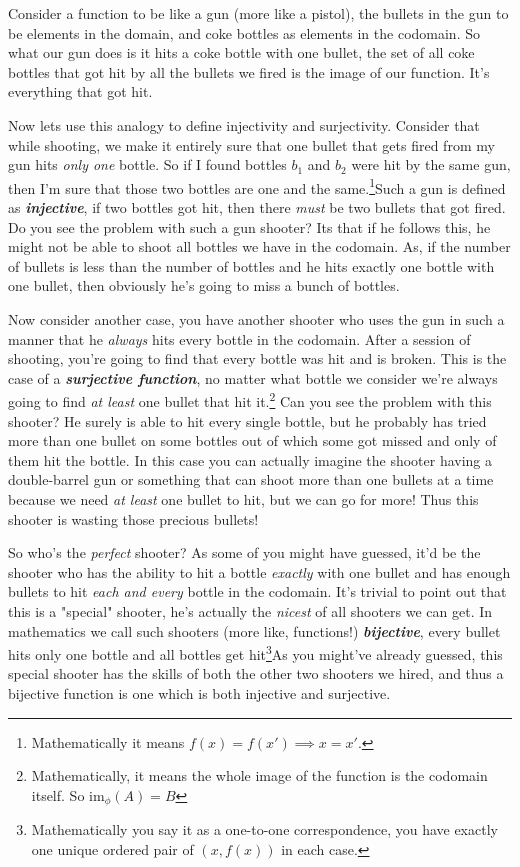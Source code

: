 \documentclass{article}
\begin{document}
Consider a function to be like a gun (more like a pistol), the bullets in the gun to be elements in the domain, and coke bottles as elements in the codomain. So what our gun does is it hits a coke bottle with one bullet, the set of all coke bottles that got hit by all the bullets we fired is the image of our function. It's everything that got hit. 

Now lets use this analogy to define injectivity and surjectivity. Consider that while shooting, we make it entirely sure that one bullet that gets fired from my gun hits \textit{only one} bottle. So if I found bottles $b_{1}$ and $b_{2}$ were hit by the same gun, then I'm sure that those two bottles are one and the same.\footnote{Mathematically it means $f(x) = f(x') \implies x =x'$.}Such a gun is defined as \textit{\textbf{injective}}, if two bottles got hit, then there \emph{must} be two bullets that got fired. Do you see the problem with such a gun shooter? Its that if he follows this, he might not be able to shoot all bottles we have in the codomain. As, if the number of bullets is less than the number of bottles and he hits exactly one bottle with one bullet, then obviously he's going to miss a bunch of bottles. 


Now consider another case, you have another shooter who uses the gun in such a manner that he \emph{always} hits every bottle in the codomain. After a session of shooting, you're going to find that every bottle was hit and is broken. This is the case of a \textit{\textbf{surjective function}}, no matter what bottle we consider we're always going to find \emph{at least} one bullet that hit it.\footnote{Mathematically, it means the whole image of the function is the codomain itself. So $\mathrm{im}_{\phi}(A) = B$} Can you see the problem with this shooter? He surely is able to hit every single bottle, but he probably has tried more than one bullet on some bottles out of which some got missed and only of them hit the bottle. In this case you can actually imagine the shooter having a double-barrel gun or something that can shoot more than one bullets at a time because we need \emph{at least} one bullet to hit, but we can go for more! Thus this shooter is wasting those precious bullets!

So who's the \textit{perfect} shooter? As some of you might have guessed, it'd be the shooter who has the ability to hit a bottle \emph{exactly} with one bullet and has enough bullets to hit \emph{each and every} bottle in the codomain. It's trivial to point out that this is a "special" shooter, he's actually the \emph{nicest} of all shooters we can get. In mathematics we call such shooters (more like, functions!) \textit{\textbf{bijective}}, every bullet hits only one bottle and all bottles get hit\footnote{Mathematically you say it as a one-to-one correspondence, you have exactly one unique ordered pair of $(x,f(x))$ in each case.}As you might've already guessed, this special shooter has the skills of both the other two shooters we hired, and thus a bijective function is one which is both injective and surjective.
\end{document}
